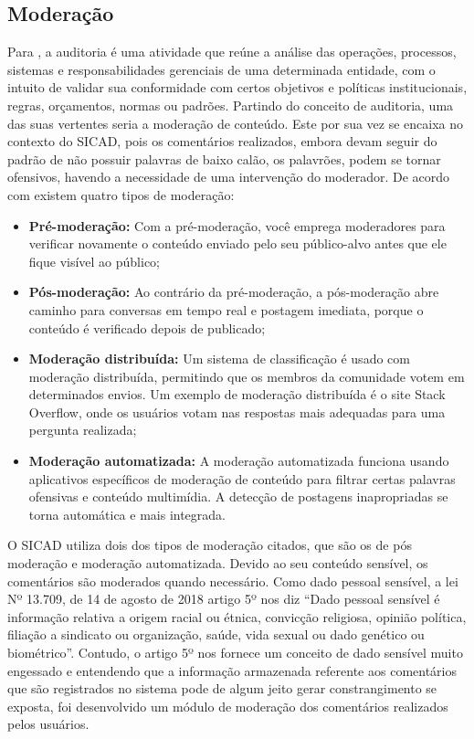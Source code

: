 \documentclass[12pt, a4paper]{report}
\begin{document}
\subsection{Moderação}
\label{subsec:moderacao}
Para \citep{netosolanca2007}, a auditoria é uma atividade que reúne a análise das operações, processos, sistemas e responsabilidades gerenciais de uma determinada entidade, com o intuito de validar sua conformidade com certos objetivos e políticas institucionais, regras, orçamentos, normas ou padrões.
Partindo do conceito de auditoria, uma das suas vertentes seria a moderação de conteúdo. Este por sua vez se encaixa no contexto do SICAD, pois os comentários realizados, embora devam seguir do padrão de não possuir palavras de baixo calão, os palavrões, podem se tornar ofensivos, havendo a necessidade de uma intervenção do moderador.
De acordo com \cite{SMITH2019} existem quatro tipos de moderação:
\begin{itemize}
\item \textbf {Pré-moderação: }Com a pré-moderação, você emprega moderadores para verificar novamente o conteúdo enviado pelo seu público-alvo antes que ele fique visível ao público; 
\item \textbf {Pós-moderação: }Ao contrário da pré-moderação, a pós-moderação abre caminho para conversas em tempo real e postagem imediata, porque o conteúdo é verificado depois de publicado;
\item \textbf {Moderação distribuída: }Um sistema de classificação é usado com moderação distribuída, permitindo que os membros da comunidade votem em determinados envios. Um exemplo de moderação distribuída é o site Stack Overflow, onde os usuários votam nas respostas mais adequadas para uma pergunta realizada;
\item \textbf {Moderação automatizada: }A moderação automatizada funciona usando aplicativos específicos de moderação de conteúdo para filtrar certas palavras ofensivas e conteúdo multimídia. A detecção de postagens inapropriadas se torna automática e mais integrada. 
\end{itemize}

O SICAD utiliza dois dos tipos de moderação citados, que são os de pós moderação e moderação automatizada. Devido ao seu conteúdo sensível, os comentários são moderados quando necessário. Como dado pessoal sensível, a lei Nº 13.709, de 14 de agosto de 2018 artigo 5º nos diz ``Dado pessoal sensível é informação relativa a origem racial ou étnica, convicção religiosa, opinião política, filiação a sindicato ou organização, saúde, vida sexual ou dado genético ou biométrico''.  Contudo, o artigo 5º nos fornece um conceito de dado sensível muito engessado e entendendo que a informação armazenada referente aos comentários que são registrados no sistema pode de algum jeito gerar constrangimento se exposta, foi desenvolvido um módulo de moderação dos comentários realizados pelos usuários.
\end{document}
